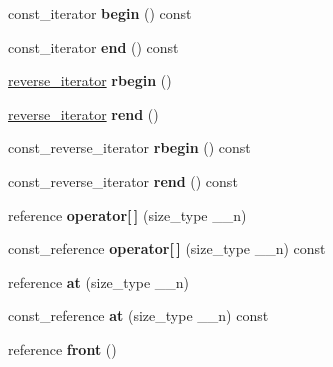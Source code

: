 \begin{DoxyCompactItemize}
\mbox{\label{classdeque_abee8f8d17f37958b4f56d2f4c2f71edf}} 
const\+\_\+iterator {\bfseries begin} () const
\item 
\mbox{\label{classdeque_a004885c837a83910ec104ceda37f0408}} 
const\+\_\+iterator {\bfseries end} () const
\item 
\mbox{\label{classdeque_a21b60cb0c9936e92371d5ad74a59619b}} 
\hyperlink{classreverse__iterator}{reverse\+\_\+iterator} {\bfseries rbegin} ()
\item 
\mbox{\label{classdeque_a6000323ead2caf0fb56c2ea65928702f}} 
\hyperlink{classreverse__iterator}{reverse\+\_\+iterator} {\bfseries rend} ()
\item 
\mbox{\label{classdeque_a660e4820eb547ee737f5cfa9ca0f5372}} 
const\+\_\+reverse\+\_\+iterator {\bfseries rbegin} () const
\item 
\mbox{\label{classdeque_a413dcab1e427b0a5f81f14c6d3bdab1f}} 
const\+\_\+reverse\+\_\+iterator {\bfseries rend} () const
\item 
\mbox{\label{classdeque_a7c16a67c6054482aa1696308d7661937}} 
reference {\bfseries operator\mbox{[}$\,$\mbox{]}} (size\+\_\+type \+\_\+\+\_\+n)
\item 
\mbox{\label{classdeque_a7de0dc94b74d36c1f1666491f18abc77}} 
const\+\_\+reference {\bfseries operator\mbox{[}$\,$\mbox{]}} (size\+\_\+type \+\_\+\+\_\+n) const
\item 
\mbox{\label{classdeque_ae77cf0a0716fd6930ec8799a00ec1e6b}} 
reference {\bfseries at} (size\+\_\+type \+\_\+\+\_\+n)
\item 
\mbox{\label{classdeque_aa61b2cf963a40af573a91a00d8231e00}} 
const\+\_\+reference {\bfseries at} (size\+\_\+type \+\_\+\+\_\+n) const
\item 
\mbox{\label{classdeque_ae6d38eb626b619b2fb356f170b250d93}} 
reference {\bfseries front} ()
\item 
\mbox{\label{classdeque_a671d811eddb80d64a420e0449583a7bb}} 

\end{DoxyCompactItemize}

